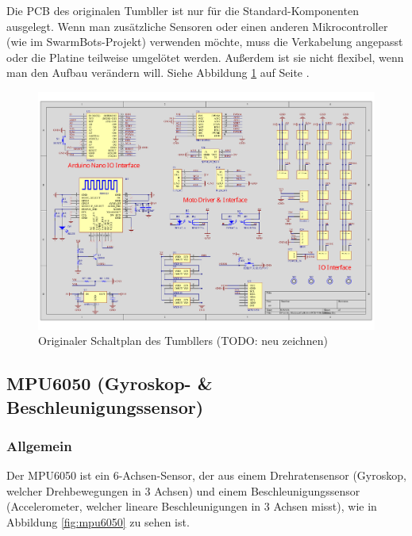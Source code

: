 Die PCB des originalen Tumbller ist nur für die Standard-Komponenten ausgelegt.
%
Wenn man zusätzliche Sensoren oder einen anderen Mikrocontroller (wie im SwarmBots-Projekt) verwenden möchte,
muss die Verkabelung angepasst oder die Platine teilweise umgelötet werden.
%
Außerdem ist sie nicht flexibel, wenn man den Aufbau verändern will.
%
Siehe Abbildung \ref{fig:elegoo_tumbller_original_circuit} auf Seite \pageref{fig:elegoo_tumbller_original_circuit}.
%
\begin{figure}
    \includegraphics[width=\textwidth, center]{img/elegoo_tumbller_original_circuit.pdf}
    \caption{Originaler Schaltplan des Tumbllers (TODO: neu zeichnen)}
    \label{fig:elegoo_tumbller_original_circuit}
\end{figure}
%
\subsection{MPU6050 (Gyroskop- \& Beschleunigungssensor)}
%
\subsubsection{Allgemein}
Der MPU6050 ist ein 6-Achsen-Sensor,
der aus einem Drehratensensor (Gyroskop, welcher Drehbewegungen in 3 Achsen)
und einem Beschleunigungssensor (Accelerometer, welcher lineare Beschleunigungen in 3 Achsen misst),
wie in Abbildung \ref{fig:mpu6050} zu sehen ist.
